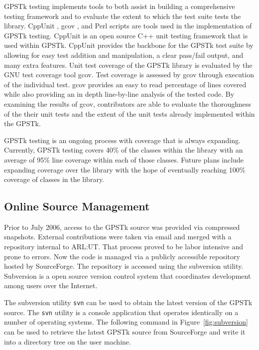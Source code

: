 \documentclass{ion-gps}
\newcommand{\gpstkapplication}[1]{\texttt{#1}}
\begin{document}
GPSTk testing implements tools to both assist in building a
comprehensive testing framework and to evaluate the extent to which
the test suite tests the library. CppUnit \cite{CppUnit}, gcov
\cite{gcov}, and Perl \cite{perl} scripts are tools used in the
implementation of GPSTk testing. CppUnit is an open source C++ unit
testing framework that is used within GPSTk. CppUnit provides the
backbone for the GPSTk test suite by allowing for easy test addition
and manipulation, a clear pass/fail output, and many extra
features. Unit test coverage of the GPSTk library is evaluated by the
GNU test coverage tool gcov. Test coverage is assessed by gcov through
execution of the individual test. gcov provides an easy to read
percentage of lines covered while also providing an in depth
line-by-line analysis of the tested code. By examining the results of
gcov, contributors are able to evaluate the thoroughness of the their
unit tests and the extent of the unit tests already implemented within
the GPSTk.

GPSTk testing is an ongoing process with coverage that is always
expanding. Currently, GPSTk testing covers 40\% of the classes within
the library with an average of 95\% line coverage within each of those
classes.  Future plans include expanding coverage over the library
with the hope of eventually reaching 100\% coverage of classes in the
library.

\subsection*{Online Source Management}
Prior to July 2006, access to the GPSTk source was provided via
compressed snapshots. External contributions were taken via email and
merged with a repository internal to ARL:UT. That process proved to be
labor intensive and prone to errors. Now the code is managed via a
publicly accessible repository hosted by SourceForge.  The repository is 
accessed using the subversion utility.  Subversion is a
open source version control system that coordinates development among
users over the Internet\cite{subversion, subversionbook}.

The subversion utility \gpstkapplication{svn} can be used to obtain
the latest version of the GPSTk source. The \gpstkapplication{svn}
utility is a console application that operates identically on a number
of operating systems.  The following command in
Figure~\ref{fig:subversion} can be used to retrieve the
latest GPSTk source from SourceForge and write it into a directory tree on
the user machine.
\end{document}
